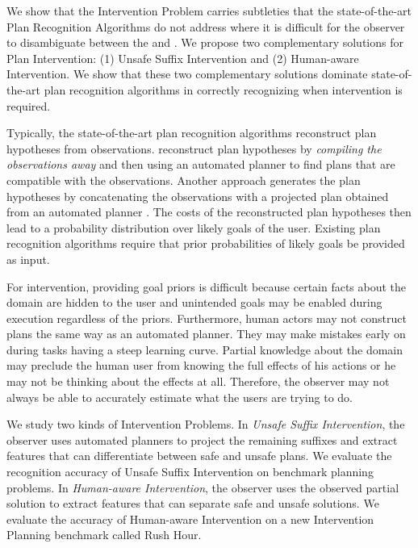 We show that the Intervention Problem carries subtleties that the state-of-the-art Plan Recognition Algorithms do not address where it is difficult for the observer to disambiguate between the \desired and \undesired.
We propose two complementary solutions for Plan Intervention: (1) Unsafe Suffix Intervention and (2) Human-aware Intervention. 
We show that these two complementary solutions dominate state-of-the-art plan recognition algorithms in correctly recognizing when intervention is required.

Typically, the state-of-the-art plan recognition algorithms reconstruct plan hypotheses from observations. \cite{ramirez2009plan, ramirez2010probabilistic} reconstruct plan hypotheses by  \textit{compiling the observations away} and then using an automated planner to find plans that are compatible with the observations. 
Another approach generates the plan hypotheses by concatenating the observations with a projected plan obtained from an automated planner \cite{vered2017}. 
The costs of the reconstructed plan hypotheses then lead to a probability distribution over likely goals of the user. 
Existing plan recognition algorithms require that prior probabilities of likely goals be provided as input. 

For intervention, providing goal priors is difficult because certain facts about the domain are hidden to the user and unintended goals may be enabled during execution regardless of the priors. 
Furthermore, human actors may not construct plans the same way as an automated planner.
They may  make mistakes early on during tasks having a steep learning curve. 
Partial knowledge about the domain may preclude the human user from knowing the full effects of his actions or he may not be thinking about the effects at all. 
Therefore, the observer may not always be able to accurately estimate what the users are trying to do.

We study two kinds of Intervention Problems. 
In \emph{Unsafe Suffix Intervention}, the observer uses automated planners to project the remaining suffixes and extract features that can differentiate between safe and unsafe plans. 
We evaluate the recognition accuracy of Unsafe Suffix Intervention on benchmark planning problems. 
In \emph{Human-aware Intervention}, the observer uses the observed partial solution to extract features that can separate safe and unsafe solutions. 
We evaluate the accuracy of Human-aware Intervention on a new Intervention Planning benchmark called Rush Hour.

